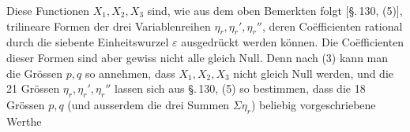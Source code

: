 
Diese Functionen $X_1, X_2, X_3$ sind, wie aus dem oben Bemerkten folgt [§.\,130, (5)], trilineare Formen der drei Variablenreihen $\eta_r, \eta_r', \eta_r''$, deren Co\"efficienten rational durch die siebente Einheitswurzel $\varepsilon$ ausgedrückt werden können. Die Co\"efficienten dieser Formen sind aber gewiss nicht alle gleich Null. Denn nach (3) kann man die Grössen $p, q$ so annehmen, dass $X_1, X_2, X_3$ nicht gleich Null werden, und die 21 Grössen $\eta_r, \eta_r', \eta_r''$ lassen sich aus §.\,130, (5) so bestimmen, dass die 18 Grössen $p, q$ (und ausserdem die drei Summen $\Sigma \eta_r$) beliebig vorgeschriebene Werthe
